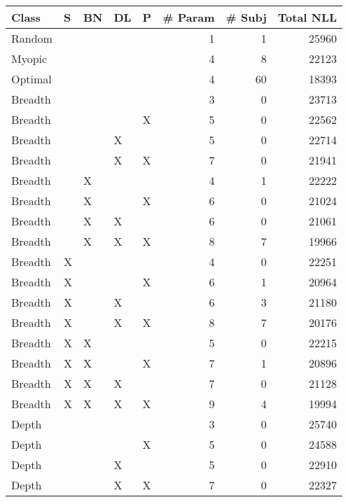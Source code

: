 \begin{tabular}{lllllrrr}
\toprule
   Class &  S & BN & DL &  P &  \# Param &  \# Subj &  Total NLL \\
\midrule
  Random &    &    &    &    &        1 &       1 &      25960 \\
  Myopic &    &    &    &    &        4 &       8 &      22123 \\
 Optimal &    &    &    &    &        4 &      60 &      18393 \\
 Breadth &    &    &    &    &        3 &       0 &      23713 \\
 Breadth &    &    &    &  X &        5 &       0 &      22562 \\
 Breadth &    &    &  X &    &        5 &       0 &      22714 \\
 Breadth &    &    &  X &  X &        7 &       0 &      21941 \\
 Breadth &    &  X &    &    &        4 &       1 &      22222 \\
 Breadth &    &  X &    &  X &        6 &       0 &      21024 \\
 Breadth &    &  X &  X &    &        6 &       0 &      21061 \\
 Breadth &    &  X &  X &  X &        8 &       7 &      19966 \\
 Breadth &  X &    &    &    &        4 &       0 &      22251 \\
 Breadth &  X &    &    &  X &        6 &       1 &      20964 \\
 Breadth &  X &    &  X &    &        6 &       3 &      21180 \\
 Breadth &  X &    &  X &  X &        8 &       7 &      20176 \\
 Breadth &  X &  X &    &    &        5 &       0 &      22215 \\
 Breadth &  X &  X &    &  X &        7 &       1 &      20896 \\
 Breadth &  X &  X &  X &    &        7 &       0 &      21128 \\
 Breadth &  X &  X &  X &  X &        9 &       4 &      19994 \\
   Depth &    &    &    &    &        3 &       0 &      25740 \\
   Depth &    &    &    &  X &        5 &       0 &      24588 \\
   Depth &    &    &  X &    &        5 &       0 &      22910 \\
   Depth &    &    &  X &  X &        7 &       0 &      22327 \\

\end{tabular}
